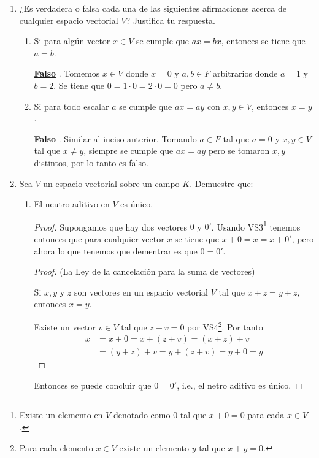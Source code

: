 \documentclass[11pt,letterpaper]{article}
\newcommand{\fals}{\textbf{\underline{Falso} }}
\begin{document}
\begin{enumerate}
\item ¿Es verdadera o falsa cada una de las siguientes afirmaciones acerca de cualquier espacio vectorial $V$?
Justifica tu respuesta.
\begin{enumerate}[label=(\alph*)]
    \item Si para algún vector $x \in V$ se cumple que $ax = bx$, entonces se tiene que $a = b$.
    
    \fals. Tomemos $x \in V$ donde $x = 0$ y $a,b \in F$ arbitrarios donde $a = 1$ y $b = 2$. Se tiene que
    $0 = 1 \cdot 0 = 2 \cdot 0 = 0$ pero $a \neq b$.

    \item Si para todo escalar $a$ se cumple que $ax = ay$ con $x,y \in V$, entonces $x = y$.
    
    \fals. Similar al inciso anterior. Tomando $a \in F$ tal que $a = 0$ y $x,y \in V$ tal que
    $x \neq y$, siempre se cumple que $ax = ay$ pero se tomaron $x, y$ distintos, por lo tanto
    es falso.
\end{enumerate}

\item Sea $V$ un espacio vectorial sobre un campo $K$. Demuestre que:
\begin{enumerate}[label=(\alph*)]
    \item El neutro aditivo en $V$ es único.
    \begin{proof}
        Supongamos que hay dos vectores $0$ y $0'$. Usando VS3\footnote{Existe un elemento en $V$ denotado como $0$
        tal que $x+0=0$ para cada $x \in V$.} tenemos entonces que para cualquier vector $x$ se tiene que
        $x + 0 = x = x + 0'$, pero ahora lo que tenemos que dementrar es que $0 = 0'$.
        \begin{proof} (La Ley de la cancelación para la suma de vectores)

            Si $x,y$ y $z$ son vectores en un espacio vectorial $V$ tal que $x + z = y + z$, entonces
            $x = y$.
            
            Existe un vector $v \in V$ tal que $z + v= 0$ por VS4\footnote{Para cada elemento $x \in V$ existe
            un elemento $y$ tal que $x+y=0$.}. Por tanto
            \begin{align*}
                x &= x + 0 = x + (z + v) = (x + z) + v\\
                  &= (y + z) + v = y + (z + v) = y + 0 = y
            \end{align*}
        \end{proof}
        Entonces se puede concluir que $0 = 0'$, i.e., el netro aditivo es único.
    \end{proof}


\end{enumerate}
\end{enumerate}
\end{document}

